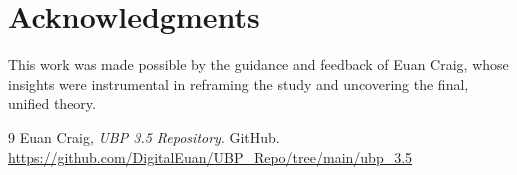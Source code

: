 \documentclass[12pt, a4paper]{article}
\begin{document}
\section*{Acknowledgments}

This work was made possible by the guidance and feedback of Euan Craig, whose insights were instrumental in reframing the study and uncovering the final, unified theory.

\begin{thebibliography}{9}
    Euan Craig, \textit{UBP 3.5 Repository}. GitHub. \\
    \url{https://github.com/DigitalEuan/UBP_Repo/tree/main/ubp_3.5}
\end{thebibliography}
\end{document}
